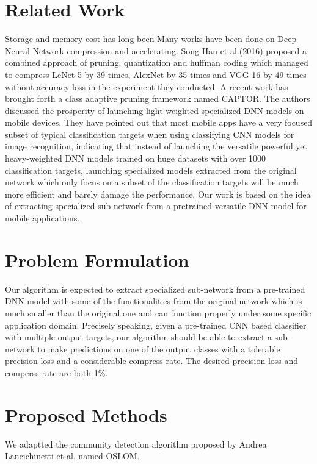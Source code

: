 \documentclass{acmtog} %
\begin{document}
\section{Related Work}
\label{sec:relatedwork}
%
Storage and memory cost has long been  Many works have been done on Deep Neural Network compression and accelerating. Song Han et al.(2016)\cite{Deep Compression} proposed a combined approach of pruning, quantization and huffman coding which managed to compress LeNet-5 by 39 times, AlexNet by 35 times and VGG-16 by 49 times without accuracy loss in the experiment they conducted. A recent work has brought forth a class adaptive pruning framework named CAPTOR\cite{CAPTOR}. The authors discussed the prosperity of launching light-weighted specialized DNN models on mobile devices. They have pointed out that most mobile apps have a very focused subset  of typical classification targets when using classifying CNN models for image recognition, indicating that instead of launching the versatile powerful yet heavy-weighted DNN models trained on huge datasets with over 1000 classification targets, launching specialized models extracted from the original network which only focus on a subset of the classification targets will be much more efficient and barely damage the performance. Our work is based on the idea of extracting specialized sub-network from a pretrained versatile DNN model for mobile applications.

\section{Problem Formulation}
\label{sec:probform}
Our algorithm is expected to extract specialized sub-network from a pre-trained DNN model with some of the functionalities from the original network which is much smaller than the original one and can function properly under some specific application domain. Precisely speaking, given a pre-trained CNN based classifier with multiple output targets, our algorithm should be able to extract a sub-network to make predictions on one of the output classes with a tolerable precision loss and a considerable compress rate. The desired precision loss and comperss rate are both 1\%.

\section{Proposed Methods}
\label{sub:methods}
We adaptted the community detection algorithm proposed by Andrea Lancichinetti et al.\cite{OSLOM} named OSLOM.
\end{document}
